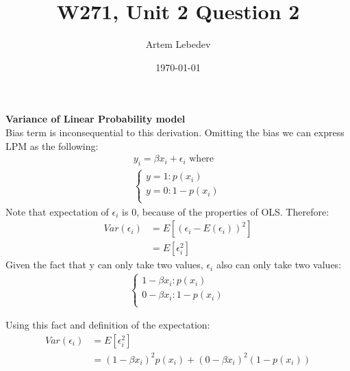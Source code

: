 \documentclass{article}
\author{Artem Lebedev}
\title{W271, Unit 2 Question 2}
\date{\today}
\begin{document}
	
\maketitle


\large \textbf{Variance of Linear Probability model}\\
Bias term is inconsequential to this derivation. Omitting the bias we can express LPM as the following:
\begin{align*}
	y_{i}=\beta x_{i} + \epsilon_{i}\text{ where}\\
	\begin{cases}
		y = 1: p(x_{i})\\
		y = 0: 1-p(x_{i})\\
	\end{cases}
\end{align*}
Note that expectation of $\epsilon_{i}$ is 0, because of the properties of OLS. Therefore:
\begin{align*}
	Var(\epsilon_{i}) &=E[(\epsilon_{i} - E(\epsilon_{i}))^2]\\
					& = E[\epsilon_{i}^2]
\end{align*}
Given the fact that y can only take two values, $\epsilon_{i}$ also can only take two values:
\begin{align*}
	\begin{cases}
		1 - \beta x_{i}: p(x_{i})\\
		0 - \beta x_{i}: 1-p(x_{i})\\
	\end{cases}
\end{align*}

Using this fact and definition of the expectation:
\begin{align*}
	Var(\epsilon_{i}) & = E[\epsilon_{i}^2]\\
					  & = (1 - \beta x_{i})^2 p(x_{i}) + (0 - \beta x_{i})^2(1-p(x_{i}))
\end{align*}
\end{document}
